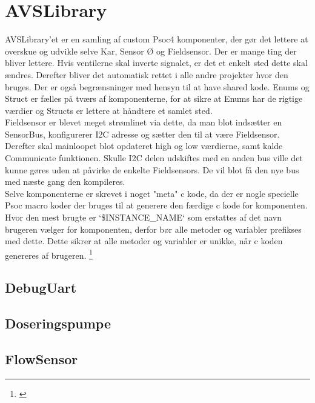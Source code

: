 \section{AVSLibrary}

AVSLibrary'et er en samling af custom Psoc4 komponenter, 
der gør det lettere at overskue og udvikle selve Kar, Sensor Ø og Fieldsensor. 
Der er mange ting der bliver lettere. Hvis ventilerne skal inverte signalet, 
er det et enkelt sted dette skal ændres. Derefter bliver det automatisk rettet i alle andre 
projekter hvor den bruges. Der er også begrænsninger med hensyn til at have 
shared kode. Enums og Struct er fælles på tværs af komponenterne, for at 
sikre at Enums har de rigtige værdier og Structs er lettere at håndtere et 
samlet sted. \\ Fieldsensor er blevet meget strømlinet via dette, da man 
blot indsætter en SensorBus, konfigurerer I2C adresse og sætter den til 
at være Fieldsensor. Derefter skal mainloopet blot opdateret high og low 
værdierne, samt kalde Communicate funktionen. Skulle I2C delen udskiftes 
med en anden bus ville det kunne gøres uden at påvirke de enkelte Fieldsensors. 
De vil blot få den nye bus med næste gang den kompileres.
\\ Selve komponenterne er skrevet i noget "meta" c kode, da der er nogle 
specielle Psoc macro koder der bruges til at generere den færdige c kode 
for komponenten. Hvor den mest brugte er `\$INSTANCE\_NAME` som erstattes 
af det navn brugeren vælger for komponenten, derfor bør alle metoder og variabler 
prefikses med dette. Dette sikrer at alle metoder og variabler er unikke, når 
c koden genereres af brugeren. \footnote{\citet{cypress:psoc4author}}

\subsection{DebugUart}


\subsection{Doseringspumpe}


\subsection{FlowSensor}


